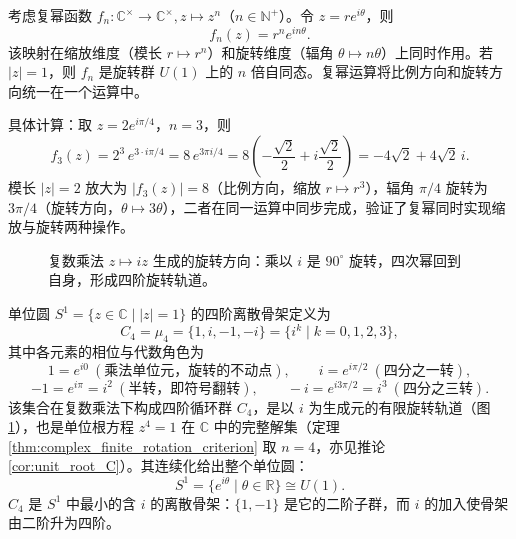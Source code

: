 \begin{example}[复幂映射中缩放与旋转的统一]\label{ex:complex_power_scaling_rotation}
考虑复幂函数 $f_n: \mathbb{C}^{\times} \to \mathbb{C}^{\times}, z \mapsto z^n$（$n \in \mathbb{N}^+$）。令 $z = re^{i\theta}$，则
\[
f_n(z) = r^n e^{in\theta}.
\]
该映射在缩放维度（模长 $r \mapsto r^n$）和旋转维度（辐角 $\theta \mapsto n\theta$）上同时作用。若 $|z|=1$，则 $f_n$ 是旋转群 $U(1)$ 上的 $n$ 倍自同态。复幂运算将比例方向和旋转方向统一在一个运算中。

具体计算：取 $z = 2 e^{i\pi/4}$，$n = 3$，则
\[
f_3(z) = 2^3\, e^{3 \cdot i\pi/4} = 8\, e^{3\pi i/4} = 8\left(-\frac{\sqrt{2}}{2} + i\frac{\sqrt{2}}{2}\right) = -4\sqrt{2} + 4\sqrt{2}\,i.
\]
模长 $|z| = 2$ 放大为 $|f_3(z)| = 8$（比例方向，缩放 $r \mapsto r^3$），辐角 $\pi/4$ 旋转为 $3\pi/4$（旋转方向，$\theta \mapsto 3\theta$），二者在同一运算中同步完成，验证了复幂同时实现缩放与旋转两种操作。
\end{example}

\begin{figure}[htbp]
\centering
{}
\caption{复数乘法 $z \mapsto iz$ 生成的旋转方向：乘以 $i$ 是 $90^\circ$ 旋转，四次幂回到自身，形成四阶旋转轨道。}
\label{fig:complex_rotation_i}
\end{figure}

\begin{definition}[单位圆的四阶离散骨架]\label{def:unit_circle_fourfold_skeleton}
单位圆 $S^1=\{z\in\mathbb{C}\mid |z|=1\}$ 的四阶离散骨架定义为
\[
C_4=\mu_4=\{1,i,-1,-i\}=\{i^k\mid k=0,1,2,3\},
\]
其中各元素的相位与代数角色为
\[
1=e^{i0}\ (\text{乘法单位元，旋转的不动点}),\qquad
i=e^{i\pi/2}\ (\text{四分之一转}),
\]
\[
-1=e^{i\pi}=i^2\ (\text{半转，即符号翻转}),\qquad
-i=e^{i3\pi/2}=i^3\ (\text{四分之三转}).
\]
该集合在复数乘法下构成四阶循环群 $C_4$，是以 $i$ 为生成元的有限旋转轨道（图 \ref{fig:complex_rotation_i}），也是单位根方程 $z^4=1$ 在 $\mathbb{C}$ 中的完整解集（定理 \ref{thm:complex_finite_rotation_criterion} 取 $n=4$，亦见推论 \ref{cor:unit_root_C}）。其连续化给出整个单位圆：
\[
S^1=\{e^{i\theta}\mid\theta\in\mathbb{R}\}\cong U(1).
\]
$C_4$ 是 $S^1$ 中最小的含 $i$ 的离散骨架：$\{1,-1\}$ 是它的二阶子群，而 $i$ 的加入使骨架由二阶升为四阶。
\end{definition}

